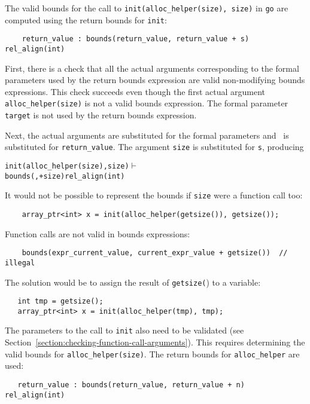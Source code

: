 The valid bounds for the call to \texttt{init(alloc\_helper(size),
size)} in \texttt{go} are computed using the return bounds for
\texttt{init}:

\begin{verbatim}
    return_value : bounds(return_value, return_value + s) rel_align(int)
\end{verbatim}

First, there is a check that all the actual arguments corresponding to
the formal parameters used by the return bounds expression are valid
non-modifying bounds expressions. This check succeeds even though the
first actual argument \texttt{alloc\_helper(size)} is not a valid bounds
expression. The formal parameter \texttt{target} is not used by the
return bounds expression.

Next, the actual arguments are substituted for the formal parameters and
\exprcurrentvalue\ is substituted for \texttt{return\_value}.
The argument \texttt{size} is substituted for \texttt{s}, producing
\begin{alltt}
    init(alloc\_helper(size), size) \(\vdash\) 
        bounds(\exprcurrentvalue, \exprcurrentvalue + size) rel_align(int)
\end{alltt}

It would not be possible to represent the bounds if \texttt{size} were a
function call too:
\begin{verbatim}
    array_ptr<int> x = init(alloc_helper(getsize()), getsize());
\end{verbatim}

Function calls are not valid in bounds expressions:

\begin{verbatim}
    bounds(expr_current_value, current_expr_value + getsize())  // illegal
\end{verbatim}

The solution would be to assign the result of \texttt{getsize(}) to a
variable:
\begin{verbatim}
   int tmp = getsize();
   array_ptr<int> x = init(alloc_helper(tmp), tmp);
\end{verbatim}

The parameters to the call to \texttt{init} also need to be validated
(see Section~\ref{section:checking-function-call-arguments}). This
requires determining the valid bounds for \texttt{alloc\_helper(size)}. The
return bounds for \texttt{alloc\_helper} are used:
\begin{verbatim}
   return_value : bounds(return_value, return_value + n) rel_align(int)
\end{verbatim}

